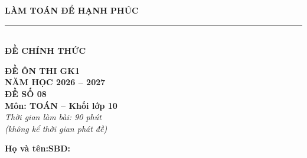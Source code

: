 \documentclass[12pt,a4paper]{article}
\begin{document}
\noindent
\begin{minipage}[c]{0.38\textwidth}
    \centering
    \textbf{LÀM TOÁN ĐỂ HẠNH PHÚC}\\[-2pt]
    \rule{3.2cm}{0.6pt}\\[4pt]
    \textbf{ĐỀ CHÍNH THỨC}
\end{minipage}\hfill
\begin{minipage}[c]{0.35\textwidth}
    \centering
    \textbf{ĐỀ ÔN THI GK1}\\
    \textbf{NĂM HỌC 2026 -- 2027}\\[2pt]
    \textbf{ĐỀ SỐ 08}\\
    \textbf{Môn: TOÁN -- Khối lớp 10}\\
    \textit{\small Thời gian làm bài: 90 phút\\(không kể thời gian phát đề)}
\end{minipage}

\vspace{0.2cm}
\noindent
\begin{minipage}[b]{0.78\textwidth}
    \textbf{Họ và tên:}\dotfill\textbf{SBD:}\makebox[3.5cm]{\dotfill}
\end{minipage}\hfill
\begin{minipage}[b]{0.20\textwidth}
    \hfill
    \setlength{\fboxrule}{0.8pt}%
\end{minipage}
\vspace{0.2cm}
\end{document}

